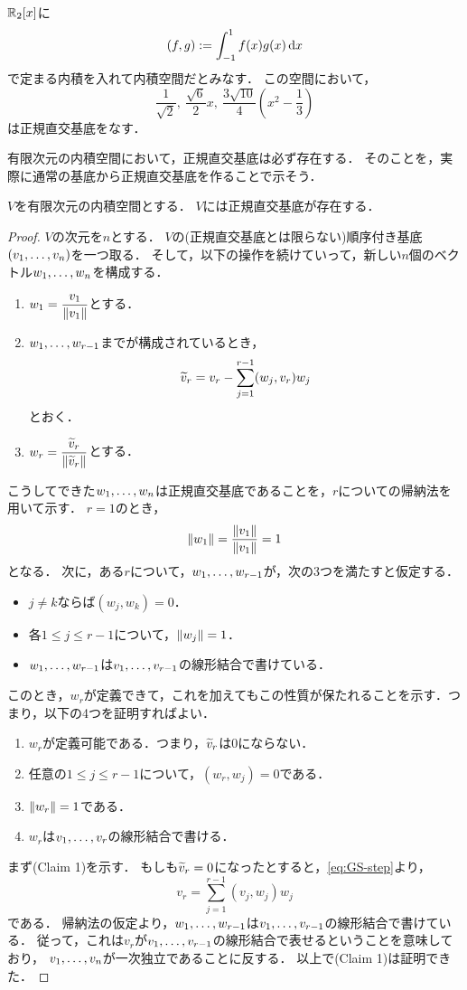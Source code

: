 \begin{example}
$\mathbb{R}_2[x]$に
\[
  (f,g) := \int_{-1}^{1} f(x)g(x)\,\mathrm{d} x
\]
で定まる内積を入れて内積空間だとみなす．
この空間において，
\[
  \frac{1}{\sqrt{2}},\ \frac{\sqrt{6}}{2} x,\ \frac{3\sqrt{10}}{4}\left(x^2 - \frac{1}{3} \right)
\]
は正規直交基底をなす．
\end{example}
有限次元の内積空間において，正規直交基底は必ず存在する．
そのことを，実際に通常の基底から正規直交基底を作ることで示そう．
\begin{thm}
$V$を有限次元の内積空間とする．
$V$には正規直交基底が存在する．
\end{thm}
\begin{proof}
$V$の次元を$n$とする．
$V$の(正規直交基底とは限らない)順序付き基底$(v_{1},\dots,v_{n})$を一つ取る．
そして，以下の操作を続けていって，新しい$n$個のベクトル$w_{1},\dots,w_{n}$を構成する．
\begin{enumerate}[label=(GS\arabic*)]
  \item $w_1 = \dfrac{v_1}{\left\| v_1 \right\|}$とする．
  \item $w_{1},\dots,w_{r-1}$までが構成されているとき，
  \begin{equation}\label{eq:GS-step}
    \widetilde{v}_{r} = v_{r} - \sum_{j=1}^{r-1} (w_j,v_r) w_j
  \end{equation}
  とおく．
  \item $w_{r} = \dfrac{\widetilde{v}_{r}}{\left\| \widetilde{v}_{r} \right\|}$とする．
\end{enumerate}
こうしてできた$w_{1},\dots,w_{n}$は正規直交基底であることを，$r$についての帰納法を用いて示す．
$r=1$のとき，
\[
  \left\| w_1 \right\| = \frac{\left\| v_1 \right\|}{\left\| v_1 \right\|} = 1  
\]
となる．
次に，ある$r$について，$w_{1},\dots,w_{r-1}$が，次の3つを満たすと仮定する．
\begin{itemize}
  \item $j \neq k$ならば$(w_j,w_k) = 0$．
  \item 各$1 \le j \le r-1$について，$\left\| w_j \right\| = 1$．
  \item $w_{1},\dots,w_{r-1}$は$v_{1},\dots,v_{r-1}$の線形結合で書けている．
\end{itemize}

このとき，$w_{r}$が定義できて，これを加えてもこの性質が保たれることを示す．つまり，以下の4つを証明すればよい．
\begin{enumerate}[label=(Claim \arabic*)]
  \item $w_{r}$が定義可能である．つまり，$\widetilde{v}_{r}$は0にならない．
  \item 任意の$1 \le j \le r-1$について，$(w_r,w_j) = 0$である．
  \item $\left\| w_r \right\|=1$である．
  \item $w_{r}$は$v_{1},\dots,v_{r}$の線形結合で書ける．
\end{enumerate}
まず(Claim 1)を示す．
もしも$\widetilde{v}_{r} = 0$になったとすると，\eqref{eq:GS-step}より，
\[
  v_{r} = \sum_{j=1}^{r-1} (v_j,w_j) w_j  
\]
である．
帰納法の仮定より，$w_{1},\dots,w_{r-1}$は$v_{1},\dots,v_{r-1}$の線形結合で書けている．
従って，これは$v_r$が$v_{1},\dots,v_{r-1}$の線形結合で表せるということを意味しており，
$v_{1},\dots,v_{n}$が一次独立であることに反する．
以上で(Claim 1)は証明できた．


\end{proof}
